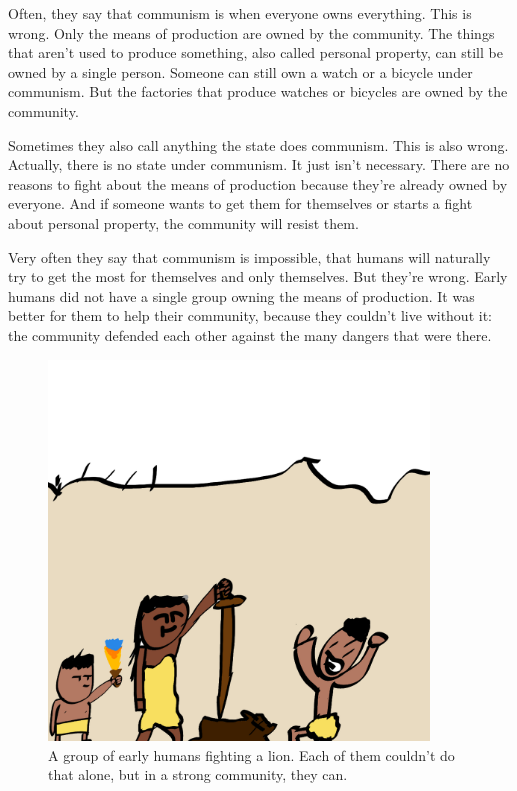\documentclass[a4paper]{book}%
\begin{document}
Often, they say that communism is when everyone owns everything. This is wrong. Only the means of production are owned by the community. The things that aren't used to produce something, also called personal property, can still be owned by a single person. Someone can still own a watch or a bicycle under communism. But the factories that produce watches or bicycles are owned by the community.

Sometimes they also call anything the state does communism. This is also wrong. Actually, there is no state under communism. It just isn't necessary. There are no reasons to fight about the means of production because they're already owned by everyone. And if someone wants to get them for themselves or starts a fight about personal property, the community will resist them.

Very often they say that communism is impossible, that humans will naturally try to get the most for themselves and only themselves. But they're wrong. Early humans did not have a single group owning the means of production. It was better for them to help their community, because they couldn't live without it: the community defended each other against the many dangers that were there.

\begin{figure}[tbhp]
\centering
\includegraphics[width=0.9\textwidth]{1-2.png}
\caption{A group of early humans fighting a lion. Each of them couldn't do that alone, but in a strong community, they can.}
\end{figure}
\end{document}

